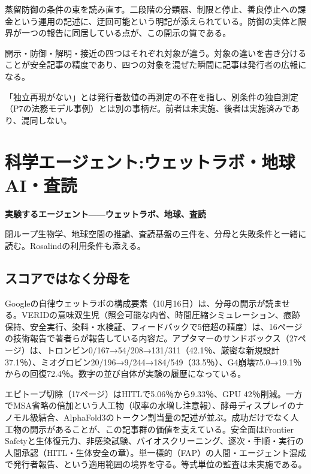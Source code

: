 \documentclass[lualatex,a4paper,10pt]{jlreq}
\begin{document}
蒸留防御の条件の束を読み直す。二段階の分類器、制限と停止、善良停止への課金という運用の記述に、迂回可能という明記が添えられている。防御の実体と限界が一つの報告に同居している点が、この開示の質である。
\cite{B41,B80}


開示・防御・解明・接近の四つはそれぞれ対象が違う。対象の違いを書き分けることが安全記事の精度であり、四つの対象を混ぜた瞬間に記事は発行者の広報になる。
\cite{B40,B79,B41,B80,B42,B81,B39,B82}


「独立再現がない」とは発行者数値の再測定の不在を指し、別条件の独自測定（P7の法務モデル事例）とは別の事柄だ。前者は未実施、後者は実施済みであり、混同しない。


\section{科学エージェント:ウェットラボ・地球AI・査読}
\label{sec:P6}

{\Large\bfseries 実験するエージェント――ウェットラボ、地球、査読\par}
\smallskip
{\color{SurveyMuted}閉ループ生物学、地球空間の推論、査読基盤の三件を、分母と失敗条件と一緒に読む。Rosalindの利用条件も添える。\par}
\bigskip

\subsection*{スコアではなく分母を}

Googleの自律ウェットラボの構成要素（10月16日）は、分母の開示が読ませる。VERIDの意味双生児（照会可能な内省、時間圧縮シミュレーション、痕跡保持、安全実行、染料・水検証、フィードバックで5倍超の精度）は、16ページの技術報告で著者らが報告している内容だ。アプタマーのサンドボックス（27ページ）は、トロンビン0/167→54/208→131/311（42.1％、厳密な新規設計37.1％）、ミオグロビン20/196→9/244→184/549（33.5％）、G4崩壊75.0→19.1％からの回復72.4％。数字の並び自体が実験の履歴になっている。
\cite{B46,B83,B44,B43,B45}


エピトープ切除（17ページ）はHITLで5.06％から9.33％、GPU 42％削減。一方でMSA省略の倍加という人工物（収率の水増し注意報）、酵母ディスプレイのナノモル級結合、AlphaFold3のトークン割当量の記述が並ぶ。成功だけでなく人工物の開示があることが、この記事群の価値を支えている。安全面はFrontier Safetyと生体復元力、非感染試験、バイオスクリーニング、逐次・手順・実行の人間承認（HITL・生体安全の章）。単一標的（FAP）の人間・エージェント混成で発行者報告、という適用範囲の境界を守る。等式単位の監査は未実施である。
\cite{B46,B83,B44,B43,B45}
\end{document}
